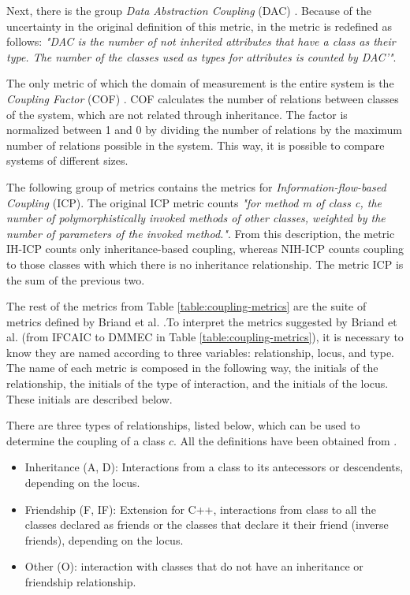 Next, there is the group \textit{Data Abstraction Coupling} (DAC) \cite{li1993object}. Because of the uncertainty in the original definition of this metric, in \cite{briand1999unified} the metric is redefined as follows: \textit{"DAC is the number of not inherited attributes that have a class as their type. The number of the classes used as types for attributes is counted by DAC'"}.

The only metric of which the domain of measurement is the entire system is the \textit{Coupling Factor} (COF) \cite{abreu1995toward}. COF calculates the number of relations between classes of the system, which are not related through inheritance. The factor is normalized between 1 and 0 by dividing the number of relations by the maximum number of relations possible in the system. This way, it is possible to compare systems of different sizes.

The following group of metrics contains the metrics for \textit{Information-flow-based Coupling} (ICP). The original ICP metric counts \textit{"for method m of class c, the number of polymorphistically invoked methods of other classes, weighted by the number of parameters of the invoked method."}. From this description, the metric IH-ICP counts only inheritance-based coupling, whereas NIH-ICP counts coupling to those classes with which there is no inheritance relationship. The metric ICP is the sum of the previous two.

The rest of the metrics from Table \ref{table:coupling-metrics} are the suite of metrics defined by Briand et al. \cite{briand1997investigation}.To interpret the metrics suggested by Briand et al. \cite{briand1997investigation}  (from IFCAIC to DMMEC in Table \ref{table:coupling-metrics}), it is necessary to know they are named according to three variables: relationship, locus, and type. The name of each metric is composed in the following way, the initials of the relationship, the initials of the type of interaction, and the initials of the locus. These initials are described below.

\bigskip\noindent
There are three types of relationships, listed below, which can be used to determine the coupling of a class $c$. All the definitions have been obtained from \cite{briand1997investigation}.

\begin{itemize}
  \item Inheritance (A, D): Interactions from a class to its antecessors or descendents, depending on the locus.
  \item Friendship (F, IF): Extension for C++, interactions from class to all the  classes declared as friends or the classes that declare it their friend (inverse friends), depending on the locus.
  \item Other (O): interaction with classes that do not have an inheritance or friendship relationship.
\end{itemize}

